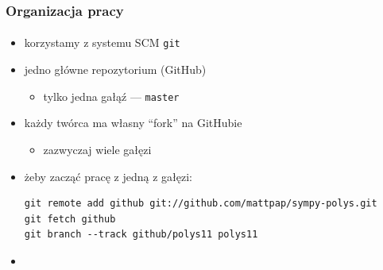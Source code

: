 \documentclass[10pt]{beamer}
\begin{document}
\begin{frame}[fragile]
    \frametitle{Organizacja pracy}
    \framesubtitle{}

    \begin{itemize}
        \item korzystamy z systemu SCM \texttt{git}
        \item jedno główne repozytorium (GitHub)
            \begin{itemize}
                \item tylko jedna gałąź --- \texttt{master}
            \end{itemize}
        \item każdy twórca ma własny ``fork'' na GitHubie
            \begin{itemize}
                \item zazwyczaj wiele gałęzi
            \end{itemize}
        \item żeby zacząć pracę z jedną z gałęzi:
            {\small
            \begin{verbatim}
git remote add github git://github.com/mattpap/sympy-polys.git
git fetch github
git branch --track github/polys11 polys11
            \end{verbatim}
            }
        \item
    \end{itemize}
\end{frame}
\end{document}
